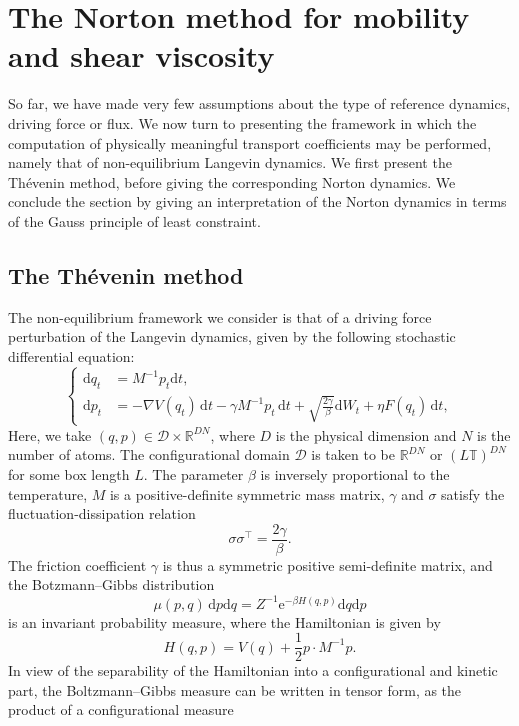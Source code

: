 \documentclass[pdflatex,sn-mathphys]{sn-jnl}%
\theoremstyle{thmstyleone}%
\theoremstyle{thmstyletwo}%
\theoremstyle{thmstylethree}%
\renewcommand{\d}{\mathrm{d}}
\newcommand{\1}{\mathbbm{1}}
\begin{document}
\section{The Norton method for mobility and shear viscosity}
So far, we have made very few assumptions about the type of reference dynamics, driving force or flux. We now turn to presenting the framework in which the computation of physically meaningful transport coefficients may be performed, namely that of non-equilibrium Langevin dynamics. We first present the Th\'evenin method, before giving the corresponding Norton dynamics. We conclude the section by giving an interpretation of the Norton dynamics in terms of the Gauss principle of least constraint.

\subsection{The Th\'evenin method}
The non-equilibrium framework we consider is that of a driving force perturbation of the Langevin dynamics, given by the following stochastic differential equation:
\begin{equation}
    \label{eq:langevin_equation}
    \left\{\begin{aligned}
    \d q_t & = M^{-1}p_t \d t, \\
    \d p_t &= -\nabla V(q_t)\,\d t -\gamma M^{-1}p_t\,\d t +\sqrt{\frac{2\gamma}{\beta}}\d W_t +\eta F(q_t)\,\d t,
    \end{aligned}\right.
\end{equation}
Here, we take $(q,p)\in \mathcal D\times \mathbb{R}^{DN}$, where $D$ is the physical dimension and $N$ is the number of atoms.
The configurational domain $\mathcal D$ is taken to be $\mathbb{R}^{DN}$ or $(L\mathbb{T})^{DN}$ for some box length $L$.
The parameter $\beta$ is inversely proportional to the temperature, $M$ is a positive-definite symmetric mass matrix, $\gamma$ and $\sigma$ satisfy the fluctuation-dissipation relation 
\[\sigma\sigma^\intercal=\frac{2\gamma}\beta.\]
The friction coefficient $\gamma$ is thus a symmetric positive semi-definite matrix, and the Botzmann--Gibbs distribution
\begin{equation}
    \label{eq:boltzmann_gibbs_measure}
    \mu(p,q)\,\d p\d q= Z^{-1}\mathrm{e}^{-\beta H(q,p)}\d q\d p
\end{equation}
is an invariant probability measure, where the Hamiltonian is given by
\[H(q,p)=V(q) +\frac12 p\cdot M^{-1}p.\]
In view of the separability of the Hamiltonian into a configurational and kinetic part, the Boltzmann--Gibbs measure can be written in tensor form, as the product of a configurational measure
\end{document}
